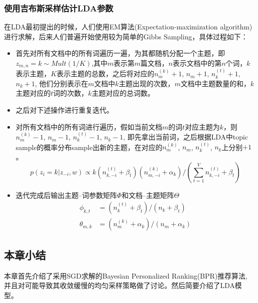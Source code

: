 \subsubsection{使用吉布斯采样估计LDA参数}
在LDA最初提出的时候，人们使用EM算法(Expectation-maximization algorithm)进行求解，后来人们普遍开始使用较为简单的Gibbs Sampling，具体过程如下：
\begin{itemize}
	\item 首先对所有文档中的所有词遍历一遍，为其都随机分配一个主题，即$z_{m,n}=k\sim Mult(1/K)$,其中$m$表示第$m$篇文档，$n$表示文档中的第$n$个词，$k$表示主题，$K$表示主题的总数，之后将对应的$n^{\left(k\right)}_m+1$, $n_m+1$, $n^{\left(t\right)}_k+1$, $n_k+1$, 他们分别表示在$m$文档中$k$主题出现的次数，$m$文档中主题数量的和，$k$主题对应的$t$词的次数，$k$主题对应的总词数。
	\item 之后对下述操作进行重复迭代。
	\item 对所有文档中的所有词进行遍历，假如当前文档$m$的词$t$对应主题为$k$，则$n^{\left(k\right)}_m-1$, $n_m-1$, $n^{\left(t\right)}_k-1$, $n_k-1$, 即先拿出当前词，之后根据LDA中topic sample的概率分布sample出新的主题，在对应的$n^{\left(k\right)}_m$, $n_m$, $n^{\left(t\right)}_k$, $n_k$上分别$+1$。
	\begin{equation}
	p(z_i=k|z_{-i},w) \propto k(n^{(t)}_{k,-i}+\beta_t)(n_{m,-i}^{(k)}+\alpha_k)/(\sum_{t=1}^{V}n_{k,-i}^{(t)}+\beta_t)
	\end{equation}
	\item 迭代完成后输出主题--词参数矩阵$\Phi$和文档--主题矩阵$\Theta$
	\begin{align}
	\phi_{k,t}   &=(n_k^{(t)}+\beta_t)/(n_k+\beta_t)  \\
	\theta_{m,k} &=(n_m^{(k)}+\alpha_k)/(n_m+\alpha_k)
	\end{align}
\end{itemize}









\subsection{本章小结}
本章首先介绍了采用SGD求解的Bayesian Personalized Ranking(BPR)推荐算法, 并且对可能导致其收敛缓慢的均匀采样策略做了讨论。然后简要介绍了LDA模型。